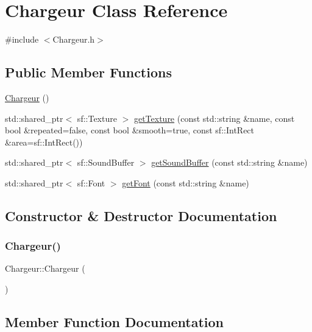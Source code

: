 \hypertarget{class_chargeur}{}\section{Chargeur Class Reference}
\label{class_chargeur}


{\ttfamily \#include $<$Chargeur.\+h$>$}

\subsection*{Public Member Functions}
\begin{DoxyCompactItemize}
\item 
\mbox{\hyperlink{class_chargeur_a9afde4ceeceddb386068e28bb4594ae4}{Chargeur}} ()
\item 
std\+::shared\+\_\+ptr$<$ sf\+::\+Texture $>$ \mbox{\hyperlink{class_chargeur_a23fce63f45f73d039cbf70cd455ed995}{get\+Texture}} (const std\+::string \&name, const bool \&repeated=false, const bool \&smooth=true, const sf\+::\+Int\+Rect \&area=sf\+::\+Int\+Rect())
\item 
std\+::shared\+\_\+ptr$<$ sf\+::\+Sound\+Buffer $>$ \mbox{\hyperlink{class_chargeur_af10ca3942dee0356b249fd9e13a65342}{get\+Sound\+Buffer}} (const std\+::string \&name)
\item 
std\+::shared\+\_\+ptr$<$ sf\+::\+Font $>$ \mbox{\hyperlink{class_chargeur_af12147248dcd01072fee81d35a015867}{get\+Font}} (const std\+::string \&name)
\end{DoxyCompactItemize}


\subsection{Constructor \& Destructor Documentation}
\mbox{\label{class_chargeur_a9afde4ceeceddb386068e28bb4594ae4}} 
\subsubsection{\texorpdfstring{Chargeur()}{Chargeur()}}
{\footnotesize\ttfamily Chargeur\+::\+Chargeur (\begin{DoxyParamCaption}{ }\end{DoxyParamCaption})}



\subsection{Member Function Documentation}
\mbox{\label{class_chargeur_af12147248dcd01072fee81d35a015867}} 
